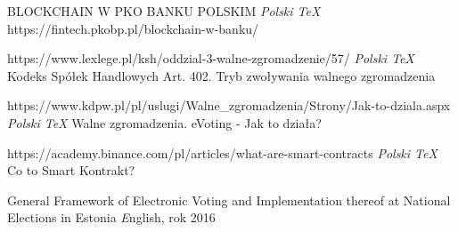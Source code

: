 \documentclass[a4paper,12pt]{book}
\begin{document}
\begin{thebibliography}{99}
BLOCKCHAIN W PKO BANKU POLSKIM
\emph{Polski \TeX} https://fintech.pkobp.pl/blockchain-w-banku/

https://www.lexlege.pl/ksh/oddzial-3-walne-zgromadzenie/57/
\emph{Polski \TeX} Kodeks Spółek Handlowych Art. 402. Tryb zwoływania walnego zgromadzenia

 https://www.kdpw.pl/pl/uslugi/Walne\_zgromadzenia/Strony/Jak-to-dziala.aspx
\emph{Polski \TeX} Walne zgromadzenia. eVoting - Jak to działa?

 https://academy.binance.com/pl/articles/what-are-smart-contracts
\emph{Polski \TeX} Co to Smart Kontrakt?

 General Framework of Electronic Voting
and Implementation thereof at National Elections in
Estonia \emph English, rok 2016

\end{thebibliography}
\end{document}
